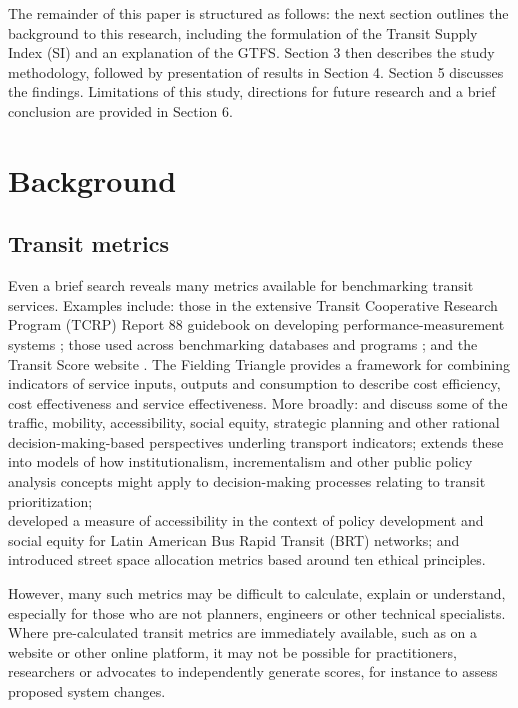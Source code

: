 \documentclass[preprint, 3p,
authoryear]{elsarticle} %
\begin{document}
The remainder of this paper is structured as follows: the next section
outlines the background to this research, including the formulation of
the Transit Supply Index (SI) and an explanation of the GTFS. Section 3
then describes the study methodology, followed by presentation of
results in Section 4. Section 5 discusses the findings. Limitations of
this study, directions for future research and a brief conclusion are
provided in Section 6.

\section{Background}\label{background}

\subsection{Transit metrics}\label{transit-metrics}

Even a brief search reveals many metrics available for benchmarking
transit services. Examples include: those in the extensive Transit
Cooperative Research Program (TCRP) Report 88 guidebook on developing
performance-measurement systems \citep{Ryus:2003aa}; those used across
benchmarking databases and programs
\citep{Florida-Transit-Information-System:2018aa, UITP:2015aa, Imperial-College-London:2023aa};
and the Transit Score website \citep{WalkScore:2023tg}. The Fielding
Triangle \citep{FieldingGordonJ1987Mpts} provides a framework for
combining indicators of service inputs, outputs and consumption to
describe cost efficiency, cost effectiveness and service effectiveness.
More broadly: \citet{Litman:2003ab} and \citet{Litman:2016aa} discuss
some of the traffic, mobility, accessibility, social equity, strategic
planning and other rational decision-making-based perspectives underling
transport indicators; \citet{Reynolds:2017ah} extends these into models
of how institutionalism, incrementalism and other public policy analysis
concepts might apply to decision-making processes relating to transit
prioritization; \citet{GuzmanLuisA.2017Aeit}\\
developed a measure of accessibility in the context of policy
development and social equity for Latin American Bus Rapid Transit (BRT)
networks; and \citet{Creutzig2020streetspaceallocation} introduced
street space allocation metrics based around ten ethical principles.

However, many such metrics may be difficult to calculate, explain or
understand, especially for those who are not planners, engineers or
other technical specialists. Where pre-calculated transit metrics are
immediately available, such as on a website or other online platform, it
may not be possible for practitioners, researchers or advocates to
independently generate scores, for instance to assess proposed system
changes.
\end{document}
